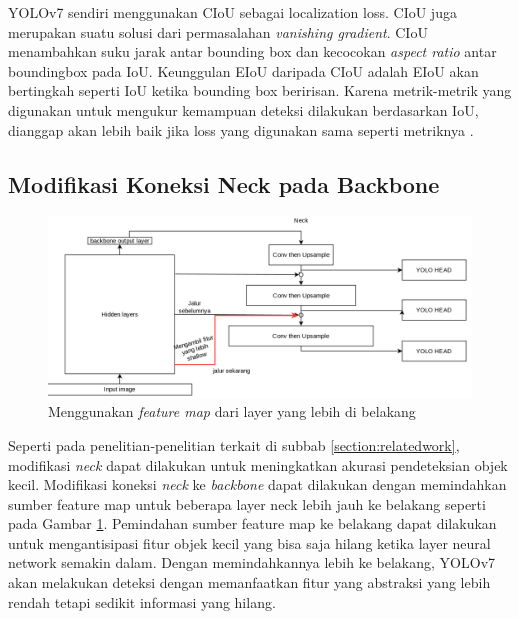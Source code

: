       YOLOv7 sendiri menggunakan CIoU sebagai localization loss. CIoU juga merupakan suatu solusi
      dari permasalahan \emph{vanishing gradient}. CIoU menambahkan suku jarak antar bounding box 
      dan kecocokan \emph{aspect ratio} antar boundingbox pada IoU. Keunggulan EIoU daripada CIoU
      adalah EIoU akan bertingkah seperti IoU ketika bounding box beririsan. Karena metrik-metrik
      yang digunakan untuk mengukur kemampuan deteksi dilakukan berdasarkan IoU, dianggap akan
      lebih baik jika loss yang digunakan sama seperti metriknya \parencite{eiou}.

  \subsection{Modifikasi Koneksi Neck pada Backbone}
    \begin{figure}[H]
      \centering
      \includegraphics[scale=0.5]{figures/neck-move-back.png}
      \caption{Menggunakan \emph{feature map} dari layer yang lebih di belakang}
      \label{fig:neckmoveback}
    \end{figure}
    Seperti pada penelitian-penelitian terkait di subbab \ref{section:relatedwork}, modifikasi \emph{neck} dapat dilakukan untuk meningkatkan akurasi pendeteksian objek kecil.
    Modifikasi koneksi \emph{neck} ke \emph{backbone} dapat dilakukan dengan memindahkan sumber feature map untuk beberapa layer neck lebih jauh ke belakang seperti pada Gambar \ref{fig:neckmoveback}.
    Pemindahan sumber feature map ke belakang dapat dilakukan untuk mengantisipasi fitur objek kecil yang bisa saja hilang ketika layer neural network semakin dalam.
    Dengan memindahkannya lebih ke belakang, YOLOv7 akan melakukan deteksi dengan memanfaatkan fitur yang abstraksi yang lebih rendah tetapi sedikit informasi yang hilang.
